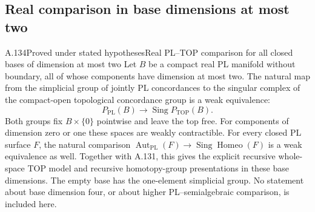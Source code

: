 \subsection{Real comparison in base dimensions at most two}

\begin{saresult}{A.134}{Proved under stated hypotheses}{Real PL--TOP comparison for all closed bases of dimension at most two}
Let $B$ be a compact real PL manifold without boundary, all of whose
components have dimension at most two. The natural map from the simplicial
group of jointly PL concordances to the singular complex of the compact-open
topological concordance group is a weak equivalence:
\[
 P_{\mathrm{PL}}(B)\longrightarrow
 \operatorname{Sing}P_{\mathrm{TOP}}(B).
                                                        \tag{A.134.1}
\]
Both groups fix $B\times\{0\}$ pointwise and leave the top free.
For components of dimension zero or one these spaces are weakly
contractible. For every closed PL surface $F$, the natural comparison
$\operatorname{Aut}_{\mathrm{PL}}(F)\to
\operatorname{Sing}\operatorname{Homeo}(F)$ is a weak equivalence as well.
Together with A.131, this gives the explicit recursive whole-space TOP
model and recursive homotopy-group presentations in these base dimensions.
The empty base has the one-element simplicial group. No statement about
base dimension four, or about higher PL--semialgebraic comparison, is
included here.
\end{saresult}
